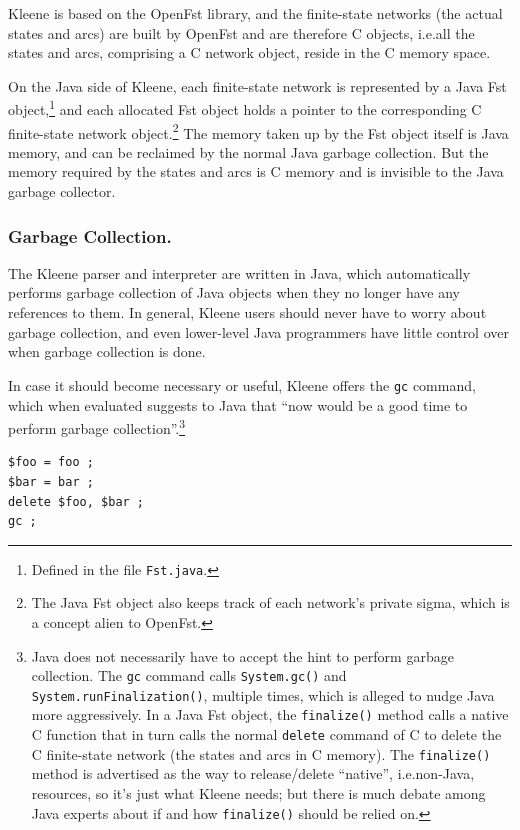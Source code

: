 \documentclass[letterpaper,12pt]{article}
\def\CPP{{C\nolinebreak[4]\hspace{-.08em}\raisebox{.3ex}{\footnotesize\bf
+}\nolinebreak\hspace{-.1em}\raisebox{.3ex}{\footnotesize\bf +}}}
\begin{document}
Kleene is based on the OpenFst library, and the finite-state networks
(the actual states and arcs) are built by OpenFst and are therefore
\CPP{} objects, i.e.\@ all the states and arcs, comprising a \CPP{}
network object, reside in the \CPP{} memory space.

On the Java side of Kleene, each finite-state network is represented by a
Java Fst object,\footnote{Defined in the file \texttt{Fst.java}.} and
each allocated Fst object holds a pointer to the corresponding \CPP{}
finite-state network object.\footnote{The Java Fst object also keeps
track of each network's private sigma, which is a concept alien to
OpenFst.}  The memory taken up by the Fst object itself is Java memory,
and can be reclaimed by the normal Java garbage collection.  But the
memory required by the states and arcs is \CPP{} memory and is invisible
to the Java garbage collector.

\subsubsection{Garbage Collection.}

The Kleene parser and interpreter are written in Java, which
automatically performs garbage collection of Java objects when they no
longer have any references to them.  In general, Kleene users should
never have to worry about garbage collection, and even lower-level Java
programmers have little control over when garbage collection is done.  

In case it should become necessary or useful, Kleene offers the
\texttt{gc} command, which when evaluated suggests to Java that ``now
would be a good time to perform garbage collection''.\footnote{Java does
not necessarily have to accept the hint to perform garbage collection.
The \texttt{gc} command calls \texttt{System.gc()} and
\texttt{System.runFinalization()}, multiple times, which is alleged to
nudge Java more aggressively.  In a Java Fst object, the
\texttt{finalize()} method calls a native \CPP{} function that in turn
calls the normal \texttt{delete} command of \CPP{} to delete the \CPP{}
finite-state network (the states and arcs in \CPP{} memory). The
\texttt{finalize()} method is advertised as the way to release/delete
``native'', i.e.\@ non-Java, resources, so it's just what Kleene needs;
but there is much debate among Java experts about if and how
\texttt{finalize()} should be relied on.}

\begin{samepage}
\begin{Verbatim}[fontsize=\small]
$foo = foo ;
$bar = bar ;
delete $foo, $bar ;
gc ;
\end{Verbatim}
\end{samepage}
\end{document}
